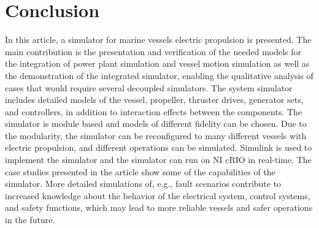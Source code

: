 \documentclass[journal]{IEEEtran}
\begin{document}


\section*{Conclusion}
\label{sec:conclusion}
In this article, a simulator for marine vessels electric propulsion is presented.
The main contribution is the presentation and verification of the needed models for the integration of power plant simulation and vessel motion simulation as well as the demonstration of the integrated simulator, enabling the qualitative analysis of cases that would require several decoupled simulators.
The system simulator includes detailed models of the vessel, propeller, thruster drives, generator sets, and controllers, in addition to interaction effects between the components.
The simulator is module based and models of different fidelity can be chosen.
Due to the modularity, the simulator can be reconfigured to many different vessels with electric propulsion, and different operations can be simulated.
Simulink is used to implement the simulator and the simulator can run on NI cRIO in real-time.
The case studies presented in the article show some of the capabilities of the simulator. More detailed simulations of, e.g.,  fault scenarios contribute to increased knowledge about the behavior of the electrical system, control systems, and safety functions, which may lead to more reliable vessels and safer operations in the future. 




 

\todos
\end{document}
